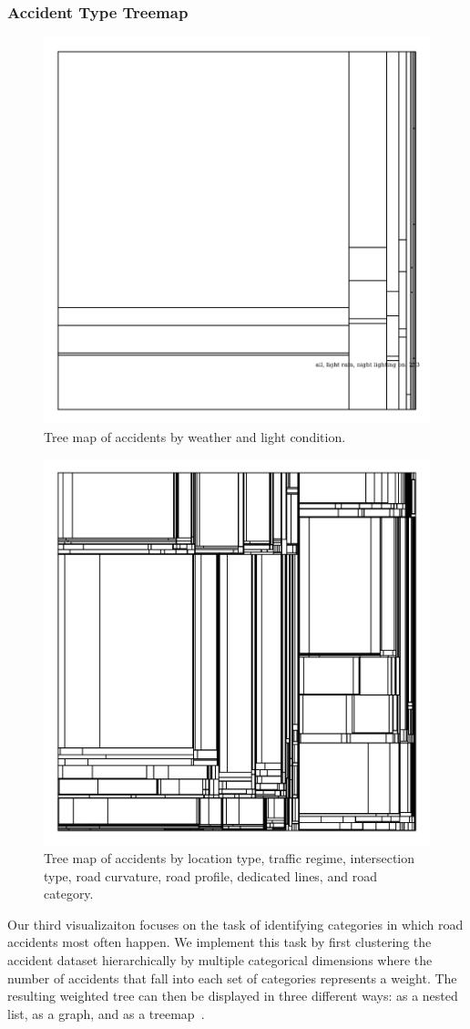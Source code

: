 \subsubsection{Accident Type Treemap}
\begin{figure}
    \centering
    \includegraphics[width=0.6\linewidth]{figures/tree-treemap-weather-light-condition.png}
    \caption{Tree map of accidents by weather and light condition.}
    \label{figure-treemap-weather-light-condition}
\end{figure}
\begin{figure}
    \centering
    \includegraphics[width=0.6\linewidth]{figures/tree-treemap-location-type-traffic-regime-intersection-type-road-curvature-road-profile-dedicated-line-road-category.png}
    \caption{Tree map of accidents by location type, traffic regime, intersection type, road curvature, road profile, dedicated lines, and road category.}
    \label{figure-treemap-many}
\end{figure}
Our third visualizaiton focuses on the task of identifying categories in which road accidents most often happen. We implement this task by first clustering the accident dataset hierarchically by multiple categorical dimensions where the number of accidents that fall into each set of categories represents a weight. The resulting weighted tree can then be displayed in three different ways: \Ni as a nested list, \Nii as a graph, and \Niii as a treemap~\cite{Shneiderman1992}.
